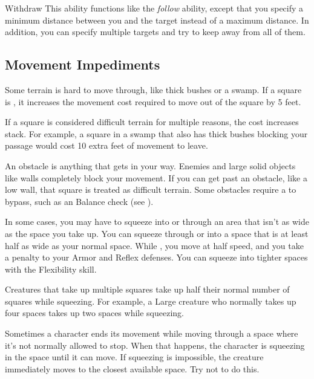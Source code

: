         \begin{activeability}{Withdraw}
            \label{Withdraw}
            \rankline
            This ability functions like the \textit{follow} ability, except that you specify a minimum distance between you and the target instead of a maximum distance.
            In addition, you can specify multiple targets and try to keep away from all of them.
        \end{activeability}

    \subsection{Movement Impediments}

        \label{Difficult Terrain}
        Some terrain is hard to move through, like thick bushes or a swamp.
        If a square is , it increases the movement cost required to move out of the square by 5 feet.

        If a square is considered difficult terrain for multiple reasons, the cost increases stack.
        For example, a square in a swamp that also has thick bushes blocking your passage would cost 10 extra feet of movement to leave.

        An obstacle is anything that gets in your way. Enemies and large solid objects like walls completely block your movement. If you can get past an obstacle, like a low wall, that square is treated as difficult terrain. Some obstacles require a  to bypass, such as an Balance check (see ).

        \label{Squeezing}
        In some cases, you may have to squeeze into or through an area that isn't as wide as the space you take up.
        You can squeeze through or into a space that is at least half as wide as your normal space.
        While \squeezing, you move at half speed, and you take a  penalty to your Armor and Reflex defenses.
        You can squeeze into tighter spaces with the Flexibility skill.

        Creatures that take up multiple squares take up half their normal number of squares while squeezing. For example, a Large creature who normally takes up four spaces takes up two spaces while squeezing.

         Sometimes a character ends its movement while moving through a space where it's not normally allowed to stop. When that happens, the character is squeezing in the space until it can move. If squeezing is impossible, the creature immediately moves to the closest available space. Try not to do this.

